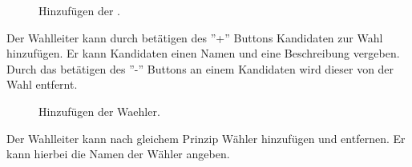 \documentclass[parskip=full,11pt,twoside]{scrartcl}
\begin{document}
\begin{figure}[H]
	\caption{\label{fig:wlltr-candidate}
		Hinzufügen der .
	}
\end{figure}
Der Wahlleiter kann durch betätigen des ''+'' Buttons Kandidaten zur Wahl hinzufügen.
Er kann Kandidaten einen Namen und eine Beschreibung vergeben.
Durch das betätigen des ''-'' Buttons an einem Kandidaten wird dieser von der Wahl entfernt.

\begin{figure}[H]
	\caption{\label{fig:wlltr-voter}
		Hinzufügen der \gls{Waehler}.
	}
\end{figure}
Der Wahlleiter kann nach gleichem Prinzip Wähler hinzufügen und entfernen.
Er kann hierbei die Namen der Wähler angeben.
\end{document}
